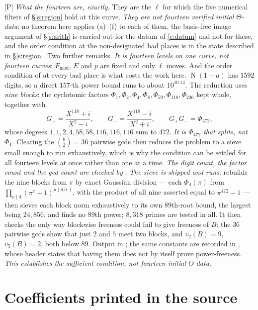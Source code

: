 \documentclass[11pt]{article}
\theoremstyle{plain}
\theoremstyle{definition}
\newcommand{\Norm}{\operatorname{N}}
\begin{document}
\textup{[P]} \emph{What the fourteen are, exactly.}  They are the $\ell$ for which the
five numerical filters of \S\ref{s:region} hold at this curve.  \emph{They are not
fourteen verified initial $\Theta$-data}: no theorem here applies
\cite[Def.~3.1]{IUT1}(a)--(f) to each of them, the basis-free image argument of
\S\ref{s:arith} is carried out for the datum of \eqref{e:datum} and not for these, and
the order condition at the non-designated bad places is in the state described in
\S\ref{s:region}.  Two further remarks.  \emph{It is fourteen levels on one curve, not
fourteen curves}: $F_{\mathrm{mod}}$, $E$ and $p$ are fixed and only $\ell$ moves.
And the order condition of \cite[Def.~3.1(c)]{IUT1} at every bad place is what costs
the work here.  $\Norm(1-a)$ has $1592$ digits, so a direct $157$-th power bound runs
to about $10^{10.14}$.  The reduction uses \emph{nine blocks}: the cyclotomic factors
$\Phi_1,\Phi_2,\Phi_4,\Phi_8,\Phi_{59},\Phi_{118},\Phi_{236}$ kept whole, together with
\[
 G_{+}=\frac{X^{118}+i}{X^{2}-i},\qquad G_{-}=\frac{X^{118}-i}{X^{2}+i},
 \qquad G_{+}G_{-}=\Phi_{472},
\]
whose degrees $1,1,2,4,58,58,116,116,116$ sum to $472$.  \emph{It is $\Phi_{472}$ that
splits, not $\Phi_4$.}  Clearing the $\binom92=36$ pairwise gcds then reduces the
problem to a sieve small enough to run exhaustively, which is why the condition can
be settled for all fourteen levels at once rather than one at a time.  \emph{The digit
count, the factor count and the gcd count are checked by} ;
\emph{The sieve is shipped and runs}: 
rebuilds the nine blocks from $\pi$ by exact Gaussian division --- each $\Phi_d(\pi)$
from $\prod_{e\mid d}(\pi^e-1)^{\mu(d/e)}$, with the product of all nine asserted equal
to $\pi^{472}-1$ --- then sieves each block norm exhaustively to its own $89$th-root
bound, the largest being $24{,}856$, and finds no $89$th power; $8{,}318$ primes are
tested in all.  It then checks the only way blockwise freeness could fail to give
freeness of $B$: the $36$ pairwise gcds show that just $2$ and $5$ meet two blocks, and
$v_2(B)=9$, $v_5(B)=2$, both below $89$.  Output in
; the same constants are recorded in
, whose header states that having them does not by
itself prove power-freeness.  \emph{This establishes the sufficient condition, not
fourteen initial $\Theta$-data.}

\section{Coefficients printed in the source}\label{s:coeff}
\end{document}

